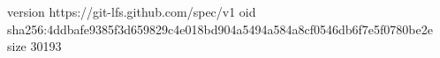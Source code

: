 version https://git-lfs.github.com/spec/v1
oid sha256:4ddbafe9385f3d659829c4e018bd904a5494a584a8cf0546db6f7e5f0780be2e
size 30193
